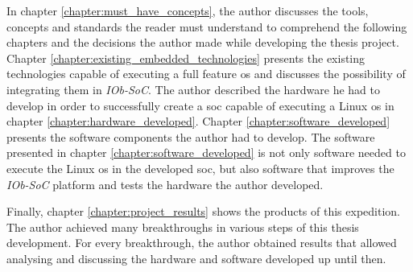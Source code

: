 In chapter \ref{chapter:must_have_concepts}, the author discusses the tools, concepts and standards the reader must understand to comprehend the following chapters and the decisions the author made while developing the thesis project. Chapter \ref{chapter:existing_embedded_technologies} presents the existing technologies capable of executing a full feature \acrlong{os} and discusses the possibility of integrating them in \textit{IOb-SoC}. The author described the hardware he had to develop in order to successfully create a \acrshort{soc} capable of executing a Linux \acrshort{os} in chapter \ref{chapter:hardware_developed}. Chapter \ref{chapter:software_developed} presents the software components the author had to develop. The software presented in chapter \ref{chapter:software_developed} is not only software needed to execute the Linux \acrshort{os} in the developed \acrshort{soc}, but also software that improves the \textit{IOb-SoC} platform and tests the hardware the author developed.

Finally, chapter \ref{chapter:project_results} shows the products of this expedition. The author achieved many breakthroughs in various steps of this thesis development. For every breakthrough, the author obtained results that allowed analysing and discussing the hardware and software developed up until then.
